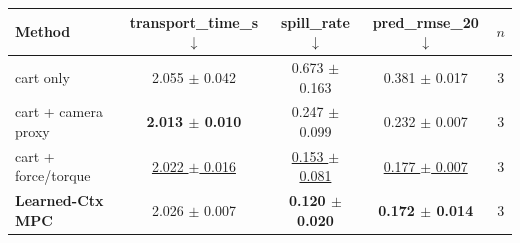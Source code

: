 \begin{tabular}{lcccc}
\toprule
Method & transport\_time\_s $\downarrow$ & spill\_rate $\downarrow$ & pred\_rmse\_20 $\downarrow$ & $n$ \\
\midrule
cart only & 2.055 $\pm$ 0.042 & 0.673 $\pm$ 0.163 & 0.381 $\pm$ 0.017 & 3 \\
cart + camera proxy & \textbf{2.013 $\pm$ 0.010} & 0.247 $\pm$ 0.099 & 0.232 $\pm$ 0.007 & 3 \\
cart + force/torque & \underline{2.022 $\pm$ 0.016} & \underline{0.153 $\pm$ 0.081} & \underline{0.177 $\pm$ 0.007} & 3 \\
\textbf{Learned-Ctx MPC} & 2.026 $\pm$ 0.007 & \textbf{0.120 $\pm$ 0.020} & \textbf{0.172 $\pm$ 0.014} & 3 \\
\bottomrule
\end{tabular}
